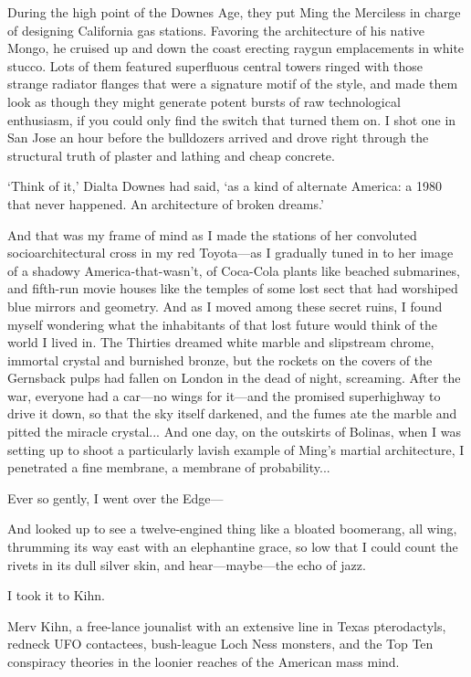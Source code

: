During the high point of the Downes Age, they put Ming the Merciless in charge of designing California gas stations. Favoring the architecture of his native Mongo, he cruised up and down the coast erecting raygun emplacements in white stucco. Lots of them featured superfluous central towers ringed with those strange radiator flanges that were a signature motif of the style, and made them look as though they might generate potent bursts of raw technological enthusiasm, if you could only find the switch that turned them on. I shot one in San Jose an hour before the bulldozers arrived and drove right through the structural truth of plaster and lathing and cheap concrete.

`Think of it,' Dialta Downes had said, `as a kind of alternate America: a 1980 that never happened. An architecture of broken dreams.'

And that was my frame of mind as I made the stations of her convoluted socioarchitectural cross in my red Toyota---as I gradually tuned in to her image of a shadowy America-that-wasn't, of Coca-Cola plants like beached submarines, and fifth-run movie houses like the temples of some lost sect that had worshiped blue mirrors and geometry. And as I moved among these secret ruins, I found myself wondering what the inhabitants of that lost future would think of the world I lived in. The Thirties dreamed white marble and slipstream chrome, immortal crystal and burnished bronze, but the rockets on the covers of the Gernsback pulps had fallen on London in the dead of night, screaming. After the war, everyone had a car---no wings for it---and the promised superhighway to drive it down, so that the sky itself darkened, and the fumes ate the marble and pitted the miracle crystal...
And one day, on the outskirts of Bolinas, when I was setting up to shoot a particularly lavish example of Ming's martial architecture, I penetrated a fine membrane, a membrane of probability...

Ever so gently, I went over the Edge---

And looked up to see a twelve-engined thing like a bloated boomerang, all wing, thrumming its way east with an elephantine grace, so low that I could count the rivets in its dull silver skin, and hear---maybe---the echo of jazz.

I took it to Kihn.

Merv Kihn, a free-lance jounalist with an extensive line in Texas pterodactyls, redneck UFO contactees, bush-league Loch Ness monsters, and the Top Ten conspiracy theories in the loonier reaches of the American mass mind.

